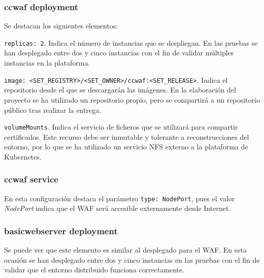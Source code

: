 \subsubsection{ccwaf deployment}
\begin{minipage}{0.8\linewidth}
  
\end{minipage}
\par Se destacan los siguientes elementos:
\par \lstinline{replicas: 2}. Indica el número de instancias que se despliegan. En las pruebas se han desplegado entre dos y cinco instancias con el fin de validar múltiples instancias en la plataforma.
\par \lstinline{image: <SET_REGISTRY>/<SET_OWNER>/ccwaf:<SET_RELEASE>}. Indica el repositorio desde el que
se descargarán las imágenes. En la elaboración del proyecto se ha utilizado un repositorio propio, pero se
compartirá a un repositorio público tras realizar la entrega.
\par \lstinline{volumeMounts}. Indica el servicio de ficheros que se utilizará para compartir certificados.
Este recurso debe ser inmutable y tolerante a reconstrucciones del entorno, por lo que se ha utilizado un
servicio NFS externo a la plataforma de Kubernetes.

\subsubsection{ccwaf service}
\begin{minipage}{0.8\linewidth}
  
\end{minipage}
\par En esta configuración destaca el parámetro \lstinline{type: NodePort}, pues el valor {\em NodePort}
indica que el WAF será accesible externamente desde Internet.

\subsubsection{ basicwebserver deployment}
\begin{minipage}{0.8\linewidth}
  
\end{minipage}
\par Se puede ver que este elemento es similar al desplegado para el WAF. En esta ocasión se han
desplegado entre dos y cinco instancias en las pruebas con el fin de validar que el entorno distribuido
funciona correctamente.


